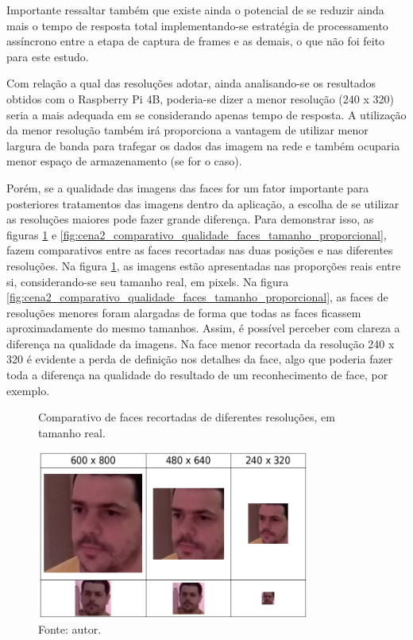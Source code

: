 Importante ressaltar também que existe ainda o potencial de se reduzir ainda mais o tempo de resposta total implementando-se estratégia de processamento assíncrono entre a etapa de captura de frames e as demais, o que não foi feito para este estudo.

Com relação a qual das resoluções adotar, ainda analisando-se os resultados obtidos com o Raspberry Pi 4B, poderia-se dizer a menor resolução (240 x 320) seria a mais adequada em se considerando apenas tempo de resposta. A utilização da menor resolução também irá proporciona a vantagem de utilizar menor largura de banda para trafegar os dados das imagem na rede e também ocuparia menor espaço de armazenamento (se for o caso).

Porém, se a qualidade das imagens das faces for um fator importante para posteriores tratamentos das imagens dentro da aplicação, a escolha de se utilizar as resoluções maiores pode fazer grande diferença. Para demonstrar isso, as figuras \ref{fig:cena2_comparativo_qualidade_faces_tamanho_real} e \ref{fig:cena2_comparativo_qualidade_faces_tamanho_proporcional}, fazem comparativos entre as faces recortadas nas duas posições e nas diferentes resoluções. Na figura \ref{fig:cena2_comparativo_qualidade_faces_tamanho_real}, as imagens estão apresentadas nas proporções reais entre si, considerando-se seu tamanho real, em pixels. Na figura \ref{fig:cena2_comparativo_qualidade_faces_tamanho_proporcional}, as faces de resoluções menores foram alargadas de forma que todas as faces ficassem aproximadamente do mesmo tamanhos. Assim, é possível perceber com clareza a diferença na qualidade da imagens. Na face menor recortada da resolução 240 x 320 é evidente a perda de definição nos detalhes da face, algo que poderia fazer toda a diferença na qualidade do resultado de um reconhecimento de face, por exemplo.

\begin{figure}[h]
    \centering
    \caption[Comparativo de faces recortadas de diferentes resoluções, em tamanho real.]{Comparativo de faces recortadas de diferentes resoluções, em tamanho real.}
    \includegraphics[width=0.8\textwidth]{Cap4_Experimentos_Realizados/Figures/cena2_comparativo_qualidade_faces_recortadas_tamanho_real.jpg}
    \caption*{Fonte: autor.}
    \label{fig:cena2_comparativo_qualidade_faces_tamanho_real}
\end{figure}

